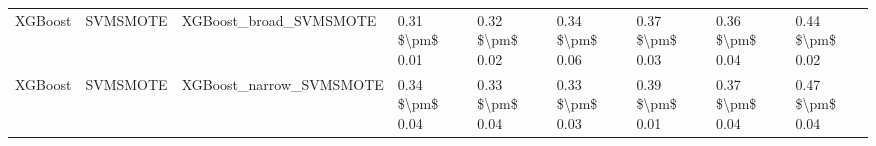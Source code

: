\begin{tabular}{lllllllll}
                        XGBoost &                      SVMSMOTE &                       XGBoost\_broad\_SVMSMOTE & 0.31 \$\textbackslash pm\$ 0.01 &           0.32 \$\textbackslash pm\$ 0.02 &       0.34 \$\textbackslash pm\$ 0.06 &        0.37 \$\textbackslash pm\$ 0.03 &                         0.36 \$\textbackslash pm\$ 0.04 &     0.44 \$\textbackslash pm\$ 0.02 \\
                        XGBoost &                      SVMSMOTE &                      XGBoost\_narrow\_SVMSMOTE & 0.34 \$\textbackslash pm\$ 0.04 &           0.33 \$\textbackslash pm\$ 0.04 &       0.33 \$\textbackslash pm\$ 0.03 &        0.39 \$\textbackslash pm\$ 0.01 &                         0.37 \$\textbackslash pm\$ 0.04 &     0.47 \$\textbackslash pm\$ 0.04 \\
\bottomrule
\end{tabular}

